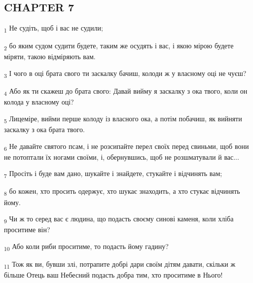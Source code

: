 \subsection{CHAPTER 7}
\begin{tcolorbox}
\textsubscript{1} Не судіть, щоб і вас не судили;
\end{tcolorbox}
\begin{tcolorbox}
\textsubscript{2} бо яким судом судити будете, таким же осудять і вас, і якою мірою будете міряти, такою відміряють вам.
\end{tcolorbox}
\begin{tcolorbox}
\textsubscript{3} І чого в оці брата свого ти заскалку бачиш, колоди ж у власному оці не чуєш?
\end{tcolorbox}
\begin{tcolorbox}
\textsubscript{4} Або як ти скажеш до брата свого: Давай вийму я заскалку з ока твого, коли он колода у власному оці?
\end{tcolorbox}
\begin{tcolorbox}
\textsubscript{5} Лицеміре, вийми перше колоду із власного ока, а потім побачиш, як вийняти заскалку з ока брата твого.
\end{tcolorbox}
\begin{tcolorbox}
\textsubscript{6} Не давайте святого псам, і не розсипайте перел своїх перед свиньми, щоб вони не потоптали їх ногами своїми, і, обернувшись, щоб не розшматували й вас...
\end{tcolorbox}
\begin{tcolorbox}
\textsubscript{7} Просіть і буде вам дано, шукайте і знайдете, стукайте і відчинять вам;
\end{tcolorbox}
\begin{tcolorbox}
\textsubscript{8} бо кожен, хто просить одержує, хто шукає знаходить, а хто стукає відчинять йому.
\end{tcolorbox}
\begin{tcolorbox}
\textsubscript{9} Чи ж то серед вас є людина, що подасть своєму синові каменя, коли хліба проситиме він?
\end{tcolorbox}
\begin{tcolorbox}
\textsubscript{10} Або коли риби проситиме, то подасть йому гадину?
\end{tcolorbox}
\begin{tcolorbox}
\textsubscript{11} Тож як ви, бувши злі, потрапите добрі дари своїм дітям давати, скільки ж більше Отець ваш Небесний подасть добра тим, хто проситиме в Нього!
\end{tcolorbox}
